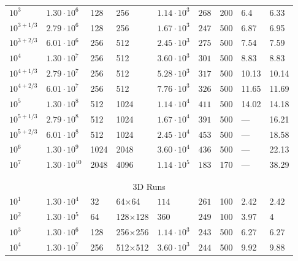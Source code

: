 \documentclass[aps, pre, onecolumn, nofootinbib, notitlepage, groupedaddress, amsfonts, amssymb, amsmath, longbibliography]{revtex4-1}
\begin{document}
\begin{table}
\begin{center}
\begin{tabularx}{\textwidth}{ X X X X | X X X | X X }
$10^3$	&	$1.30 \cdot 10^6$	&	128	&	256	&	$1.14 \cdot 10^3$	&	$268$	&	200	&	6.4	&	6.33	\\
$10^{3 + 1/3}$	&	$2.79 \cdot 10^6$	&	128	&	256	&	$1.67 \cdot 10^3$	&	$247$	&	500	&	6.87	&	6.95	\\
$10^{3 + 2/3}$	&	$6.01 \cdot 10^6$	&	256	&	512	&	$2.45 \cdot 10^3$	&	$275$	&	500	&	7.54	&	7.59	\\
$10^4$	&	$1.30 \cdot 10^7$	&	256	&	512	&	$3.60 \cdot 10^3$	&	$301$	&	500	&	8.83	&	8.83	\\
$10^{4 + 1/3}$	&	$2.79 \cdot 10^7$	&	256	&	512	&	$5.28 \cdot 10^3$	&	$317$	&	500	&	10.13	&	10.14	\\
$10^{4 + 2/3}$	&	$6.01 \cdot 10^7$	&	256	&	512	&	$7.76 \cdot 10^3$	&	$326$	&	500	&	11.65	&	11.69	\\
$10^5$	&	$1.30 \cdot 10^8$	&	512	&	1024	&	$1.14 \cdot 10^4$	&	$411$	&	500	&	14.02	&	14.18	\\
$10^{5 + 1/3}$	&	$2.79 \cdot 10^8$	&	512	&	1024	&	$1.67 \cdot 10^4$	&	$391$	&	500	&	---	&	16.21	\\
$10^{5 + 2/3}$	&	$6.01 \cdot 10^8$	&	512	&	1024	&	$2.45 \cdot 10^4$	&	$453$	&	500	&	---	&	18.58	\\
$10^6$	&	$1.30 \cdot 10^9$	&	1024	&	2048	&	$3.60 \cdot 10^4$	&	$436$	&	500	&	---	&	22.13	\\
$10^7$	&	$1.30 \cdot 10^{10}$	&	2048	&	4096	&	$1.14 \cdot 10^5$	&	$183$	&	170	&	---	&	38.29	\\
\\ \hline \hline \multicolumn{9}{c}{\vspace{-0.2cm}}\\
\multicolumn{9}{c}{\vspace{0.1cm}3D Runs} \\
\hline
$10^1$	&	$1.30 \cdot 10^4$	&	32	&	64$\times$64	&	$114$	&	$261$	&	100	&	2.42	&	2.42	\\
$10^2$	&	$1.30 \cdot 10^5$	&	64	&	128$\times$128	&	$360$	&	$249$	&	100	&	3.97	&	4	\\
$10^3$	&	$1.30 \cdot 10^6$	&	128	&	256$\times$256	&	$1.14 \cdot 10^3$	&	$243$	&	500	&	6.27	&	6.27	\\
$10^4$	&	$1.30 \cdot 10^7$	&	256	&	512$\times$512	&	$3.60 \cdot 10^3$	&	$244$	&	500	&	9.92	&	9.88	\\
\hline																	
\end{tabularx}
\end{center}
\end{table}






\end{document}
